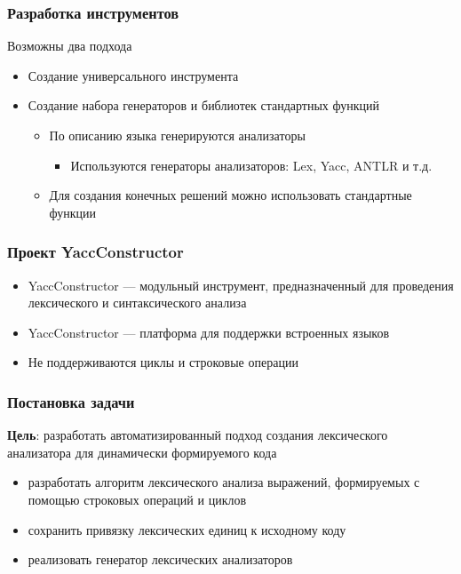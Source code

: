 \documentclass{beamer}
\begin{document}
\begin{frame}
    \transwipe[direction=90]
    \frametitle{Разработка инструментов}
    Возможны два подхода  
    \begin{itemize}
      \item Создание универсального инструмента
      \item Создание набора генераторов и библиотек стандартных функций
      \begin{itemize}
        \item По описанию языка генерируются анализаторы 
        \begin{itemize}
           \item Используются генераторы анализаторов: Lex, Yacc, ANTLR и т.д.
        \end{itemize}
        \item Для создания конечных решений можно использовать стандартные функции
      \end{itemize}
    \end{itemize}
\end{frame}

\begin{frame}
\transwipe[direction=90]
\frametitle{Проект YaccConstructor}
\begin{itemize}
\item YaccConstructor --- модульный инструмент, предназначенный для проведения лексического и синтаксического анализа  
\item YaccConstructor --- платформа для поддержки встроенных языков
\newline
\item Не поддерживаются циклы и строковые операции
\end{itemize}
\end{frame}


\begin{frame}
\transwipe[direction=90]
\frametitle{Постановка задачи}
\textbf{Цель}: разработать автоматизированный подход создания лексического анализатора для динамически формируемого кода

\begin{itemize}
\item разработать алгоритм лексического анализа выражений, формируемых с помощью строковых операций и циклов
\item сохранить привязку лексических единиц к исходному коду
\item реализовать генератор лексических анализаторов
\end{itemize}
\end{frame}
\end{document}
